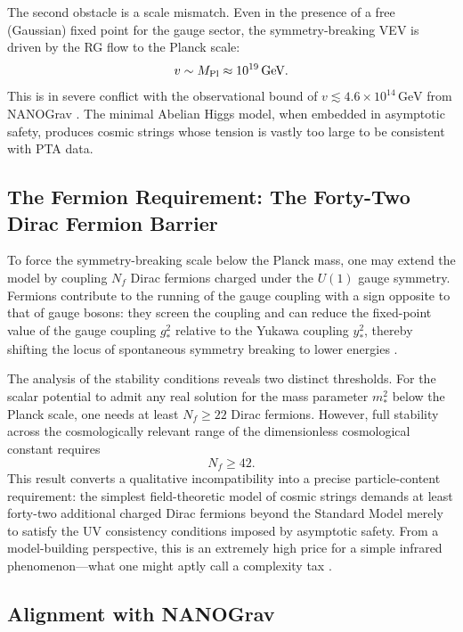 \documentclass[12pt,a4paper]{article}
\begin{document}
The second obstacle is a scale mismatch. Even in the presence of a free
(Gaussian) fixed point for the gauge sector, the symmetry-breaking VEV is
driven by the RG flow to the Planck scale:
\begin{equation}
v \sim M_{\rm Pl} \approx 10^{19}\,\text{GeV}.
\end{equation}
This is in severe conflict with the observational bound of
$v \lesssim 4.6\times 10^{14}\,\text{GeV}$ from NANOGrav \cite{NANOGrav2023}.
The minimal Abelian Higgs model, when embedded in asymptotic safety, produces
cosmic strings whose tension is vastly too large to be consistent with PTA data.

\subsection{The Fermion Requirement: The Forty-Two Dirac Fermion Barrier}

To force the symmetry-breaking scale below the Planck mass, one may extend
the model by coupling $N_f$ Dirac fermions charged under the $U(1)$ gauge
symmetry. Fermions contribute to the running of the gauge coupling with a sign
opposite to that of gauge bosons: they screen the coupling and can reduce the
fixed-point value of the gauge coupling $g_*^2$ relative to the Yukawa
coupling $y_*^2$, thereby shifting the locus of spontaneous symmetry breaking
to lower energies \cite{EichhornLinoMiqueleto2023}.

The analysis of the stability conditions reveals two distinct thresholds.
For the scalar potential to admit any real solution for the mass parameter
$m^2_*$ below the Planck scale, one needs at least $N_f \geq 22$ Dirac
fermions. However, full stability across the cosmologically relevant range of
the dimensionless cosmological constant requires
\begin{equation}
N_f \geq 42.
\end{equation}
This result converts a qualitative incompatibility into a precise
particle-content requirement: the simplest field-theoretic model of cosmic
strings demands at least forty-two additional charged Dirac fermions beyond
the Standard Model merely to satisfy the UV consistency conditions imposed by
asymptotic safety. From a model-building perspective, this is an extremely
high price for a simple infrared phenomenon---what one might aptly call a
complexity tax \cite{EichhornLinoMiqueleto2023}.

\subsection{Alignment with NANOGrav}
\end{document}
